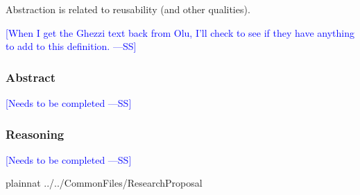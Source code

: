 \documentclass[letterpaper, cleveref]{lipics-v2019}
\newcommand{\authornote}[3]{\textcolor{#1}{[#3 ---#2]}}
\newcommand{\authornote}[3]{}
\newcommand{\wss}[1]{\authornote{blue}{SS}{#1}} %
\theoremstyle{definition}
\begin{document}
Abstraction is related to reusability (and other qualities).

\wss{When I get the Ghezzi text back from Olu, I'll check to see if they have
  anything to add to this definition.}

\begin{mybox}
\subsubsection*{Abstract} 
\wss{Needs to be completed}
\end{mybox}

\subsubsection*{Reasoning}

\wss{Needs to be completed}


\newpage

 {plainnat}
 {../../CommonFiles/ResearchProposal}
\end{document}
